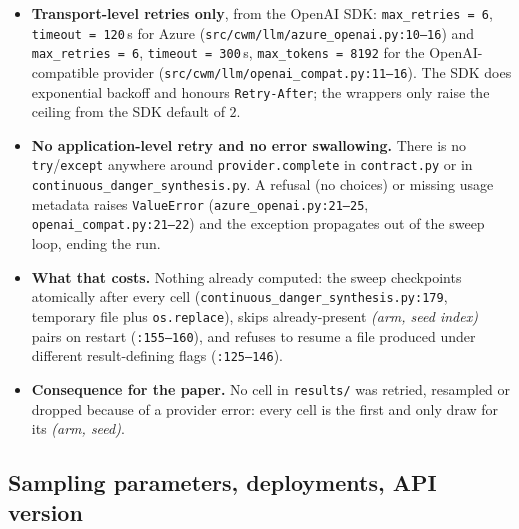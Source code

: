 \begin{itemize}
\item \textbf{Transport-level retries only}, from the OpenAI SDK:
\texttt{max\_retries = 6}, \texttt{timeout = 120}\,s for Azure
(\texttt{src/\allowbreak cwm/\allowbreak llm/\allowbreak azure\_\allowbreak openai.\allowbreak py:10--16}) and
\texttt{max\_retries = 6}, \texttt{timeout = 300}\,s, \texttt{max\_tokens = 8192} for the OpenAI-compatible provider
(\texttt{src/\allowbreak cwm/\allowbreak llm/\allowbreak openai\_\allowbreak compat.\allowbreak py:11--16}). The SDK does exponential backoff
and honours \texttt{Retry-After}; the wrappers only raise the ceiling from the
SDK default of $2$.
\item \textbf{No application-level retry and no error swallowing.} There is no
\texttt{try}/\texttt{except} anywhere around \texttt{provider.\allowbreak complete} in
\texttt{contract.py} or in \texttt{continuous\_\allowbreak danger\_\allowbreak synthesis.\allowbreak py}. A refusal
(no choices) or missing usage metadata raises \texttt{ValueError}
(\texttt{azure\_\allowbreak openai.\allowbreak py:21--25}, \texttt{openai\_\allowbreak compat.\allowbreak py:21--22}) and the
exception propagates out of the sweep loop, ending the run.
\item \textbf{What that costs.} Nothing already computed: the sweep checkpoints
atomically after every cell (\texttt{continuous\_\allowbreak danger\_\allowbreak synthesis.\allowbreak py:179},
temporary file plus \texttt{os.replace}), skips already-present
\emph{(arm, seed index)} pairs on restart (\texttt{:155--160}), and refuses to
resume a file produced under different result-defining flags
(\texttt{:125--146}).
\item \textbf{Consequence for the paper.} No cell in \texttt{results/} was
retried, resampled or dropped because of a provider error: every cell is the
first and only draw for its \emph{(arm, seed)}.
\end{itemize}

\subsection{Sampling parameters, deployments, API version}
\label{app:proto-params}

